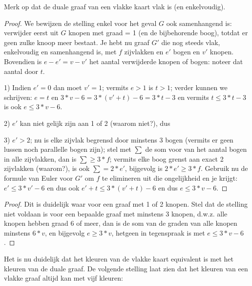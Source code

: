 Merk op dat de duale graaf van een vlakke kaart vlak is (en enkelvoudig).

\begin{proof} We bewijzen de stelling enkel voor het geval $G$ ook
samenhangend is: verwijder eerst uit $G$ knopen met graad = 1 (en de
bijbehorende boog), totdat er geen zulke knoop meer bestaat. Je hebt
nu graaf $G'$ die nog steeds vlak, enkelvoudig en samenhangend is, met $f$
zijvlakken en $e'$ bogen en $v'$ knopen. Bovendien is $e-e'=v-v'$ het aantal
verwijderde knopen of bogen: noteer dat aantal door $t$.

1) Indien $e' = 0$ dan moet $v' = 1$; vermits $e > 1$ is $t > 1$; verder
kunnen we schrijven: $e = t$ en $3*v-6 = 3*(v'+t) -6 = 3*t-3$ en
vermits $t \leq 3*t-3$ is ook $e \leq 3*v-6$.

2) $e'$ kan niet gelijk zijn aan 1 of 2 (waarom niet?), dus

3) $e' > 2$; nu
is elke zijvlak begrensd door minstens 3 bogen (vermits er geen lussen
noch parallelle bogen zijn); stel met $\sum$ de som voor van het
aantal bogen in alle zijvlakken, dan is $\sum \geq 3*f$; vermits elke
boog grenst aan exact 2 zijvlakken (waarom?), is ook $\sum = 2*e'$, bijgevolg is
$2*e' \geq 3*f$. Gebruik nu de formule van Euler voor $G'$ om $f$ te
elimineren uit die ongelijkheid en je krijgt: $e' \leq 3*v'-6$ en dus
ook $e'+t \leq 3*(v'+t)-6$ en dus $e \leq 3*v-6$.
\end{proof}

\begin{proof}
Dit is duidelijk waar voor een graaf met 1 of 2 knopen. Stel dat de
stelling niet voldaan is voor een bepaalde graaf met minstens 3
knopen, d.w.z. alle knopen hebben graad 6 of meer, dan is de som van
de graden van alle knopen minstens $6*v$, en bijgevolg $e \geq 3*v$,
hetgeen in tegenspraak is met $e \leq 3*v-6$.
\end{proof}


Het is nu duidelijk dat het kleuren van de vlakke kaart equivalent is
met het kleuren van de duale graaf.
De volgende stelling laat zien dat het kleuren van een vlakke graaf
altijd kan met vijf kleuren:

